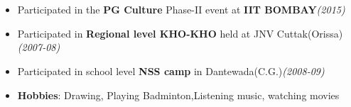 \\[-1cm]\\
\begin{itemize}
        \item Participated in the \textbf{PG Culture} Phase-II event at \textbf{IIT BOMBAY}\hfill \emph{(2015)} \\[-0.6cm]
	\item Participated in \textbf{Regional level KHO-KHO} held at JNV Cuttak(Orissa) \hfill \emph{(2007-08)} \\[-0.6cm]
	\item Participated in school level \textbf{NSS camp} in Dantewada(C.G.)\hfill \emph{(2008-09)} \\[-0.6cm]
	\item \textbf{Hobbies}: Drawing, Playing Badminton,Listening music, watching movies \\[-0.4cm]
\end{itemize}
	
